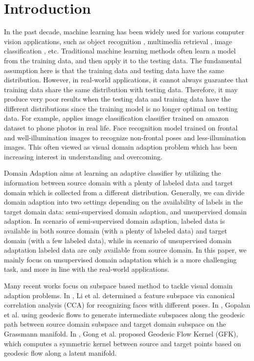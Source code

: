 \documentclass{article}
\begin{document}
\section{Introduction}
\label{sec:intro}


In the past decade, machine learning has been widely used for various computer vision applications, such as object recognition \cite{zhang2011sparse}, multimedia retrieval  \cite{zheng2015fast,zheng2014coupled,kuang2015retrieval}, image classification \cite{sanchez2013image}, etc. Traditional machine learning methods often learn a model from the training data, and then apply it to the testing data. The fundamental assumption here is that the training data and testing data have the same distribution. However, in real-world applications, it cannot always guarantee that training data share the same distribution with testing data. Therefore, it may produce very poor results when the testing data and training data have the different distributions since the training model is no longer optimal on testing data. For example, applies image classification classifier trained on amazon dataset to phone photos in real life. Face recognition model trained on frontal and well-illumination images to recognize non-frontal poses and less-illumination images. This often viewed as visual domain adaption problem which has been increasing interest in understanding and overcoming.

  Domain Adaption aims at learning an adaptive classifier by utilizing the information between source domain with a plenty of labeled data and target domain which is collected from a different distribution. Generally, we can divide domain adaption into two settings depending on the availability of labels in the target domain data: semi-supervised domain adaption, and unsupervised domain adaption.
  In scenario of semi-supervised domain adaption, labeled data is available in both source domain (with a plenty of labeled data) and target domain (with a few labeled data), while in scenario of unsupervised domain adaptation labeled data are only available from source domain.  In this paper, we mainly focus on unsupervised domain adaptation which is a more challenging task, and more in line with the real-world applications.

Many recent works \cite{gopalan2011domain,gong2012geodesic,li2009maximizing} focus on subspace based method to tackle visual domain adaption problems. In \cite{li2009maximizing}, Li et al. determined a feature subspace via canonical correlation analysis (CCA) \cite{hotelling1936relations} for recognizing faces with different poses. In \cite{gopalan2011domain}, Gopalan et al. using geodesic flows to generate intermediate subspaces along the geodesic path between source domain subspace and target domain subspace on the Grassmann manifold. In \cite{gong2012geodesic}, Gong et al. proposed Geodesic Flow Kernel (GFK), which computes a symmetric kernel between source and target points based on geodesic flow along a latent manifold.
\end{document}
